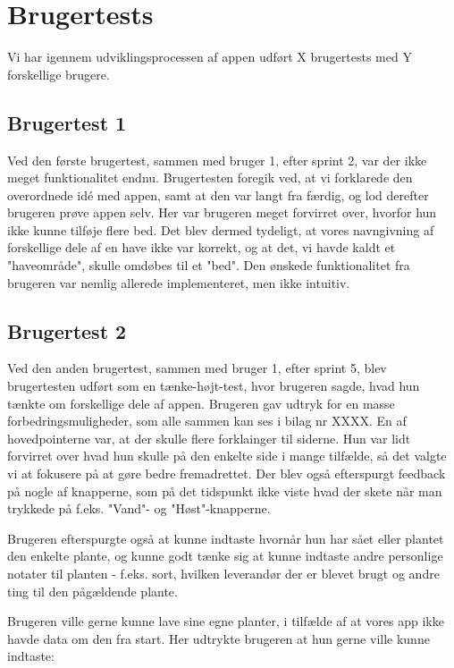 \section{Brugertests}
Vi har igennem udviklingsprocessen af appen udført X brugertests med Y forskellige brugere.

\subsection{Brugertest 1}
Ved den første brugertest, sammen med bruger 1, efter sprint 2, var der ikke meget funktionalitet endnu. Brugertesten foregik ved, at vi forklarede den overordnede idé med appen, samt at den var langt fra færdig, og lod derefter brugeren prøve appen selv. Her var brugeren meget forvirret over, hvorfor hun ikke kunne tilføje flere bed. Det blev dermed tydeligt, at vores navngivning af forskellige dele af en have ikke var korrekt, og at det, vi havde kaldt et "haveområde", skulle omdøbes til et "bed". Den ønskede funktionalitet fra brugeren var nemlig allerede implementeret, men ikke intuitiv.

\subsection{Brugertest 2}

Ved den anden brugertest, sammen med bruger 1, efter sprint 5, blev brugertesten udført som en tænke-højt-test, hvor brugeren sagde, hvad hun tænkte om forskellige dele af appen.
Brugeren gav udtryk for en masse forbedringsmuligheder, som alle sammen kan ses i bilag nr XXXX. En af hovedpointerne var, at der skulle flere forklainger til siderne. Hun var lidt forvirret over hvad hun skulle på den enkelte side i mange tilfælde, så det valgte vi at fokusere på at gøre bedre fremadrettet.
Der blev også efterspurgt feedback på nogle af knapperne, som på det tidspunkt ikke viste hvad der skete når man trykkede på f.eks. "Vand"- og "Høst"-knapperne.

Brugeren efterspurgte også at kunne indtaste hvornår hun har sået eller plantet den enkelte plante, og kunne godt tænke sig at kunne indtaste andre personlige notater til planten - f.eks. sort, hvilken leverandør der er blevet brugt og andre ting til den pågældende plante.

Brugeren ville gerne kunne lave sine egne planter, i tilfælde af at vores app ikke havde data om den fra start. Her udtrykte brugeren at hun gerne ville kunne indtaste:

